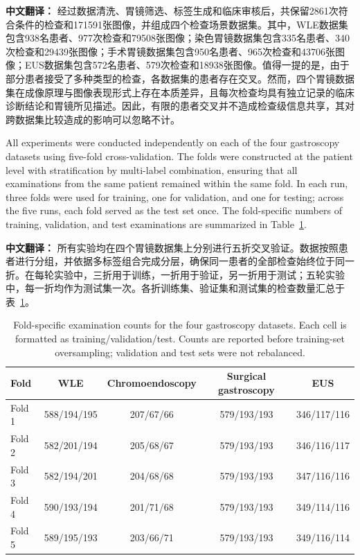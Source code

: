 \documentclass[Afour,sagev,times]{sagej}
\begin{document}
\textbf{中文翻译：} 经过数据清洗、胃镜筛选、标签生成和临床审核后，共保留2861次符合条件的检查和171591张图像，并组成四个检查场景数据集。其中，WLE数据集包含938名患者、977次检查和79508张图像；染色胃镜数据集包含335名患者、340次检查和29439张图像；手术胃镜数据集包含950名患者、965次检查和43706张图像；EUS数据集包含572名患者、579次检查和18938张图像。值得一提的是，由于部分患者接受了多种类型的检查，各数据集的患者存在交叉。然而，四个胃镜数据集在成像原理与图像表现形式上存在本质差异，且每次检查均具有独立记录的临床诊断结论和胃镜所见描述。因此，有限的患者交叉并不造成检查级信息共享，其对跨数据集比较造成的影响可以忽略不计。

All experiments were conducted independently on each of the four gastroscopy datasets using five-fold cross-validation. The folds were constructed at the patient level with stratification by multi-label combination, ensuring that all examinations from the same patient remained within the same fold. In each run, three folds were used for training, one for validation, and one for testing; across the five runs, each fold served as the test set once. The fold-specific numbers of training, validation, and test examinations are summarized in Table~\ref{T1}.

\textbf{中文翻译：} 所有实验均在四个胃镜数据集上分别进行五折交叉验证。数据按照患者进行分组，并依据多标签组合完成分层，确保同一患者的全部检查始终位于同一折。在每轮实验中，三折用于训练，一折用于验证，另一折用于测试；五轮实验中，每一折均作为测试集一次。各折训练集、验证集和测试集的检查数量汇总于表~\ref{T1}。

\begin{table}[h]
\small\sf\centering
\caption{Fold-specific examination counts for the four gastroscopy datasets. Each cell is formatted as training/validation/test. Counts are reported before training-set oversampling; validation and test sets were not rebalanced.\label{T1}}
\begin{tabular}{lcccc}
\toprule
Fold & WLE & Chromoendoscopy & Surgical gastroscopy & EUS \\
\midrule
Fold 1 & 588/194/195 & 207/67/66 & 579/193/193 & 346/117/116 \\
Fold 2 & 582/201/194 & 205/68/67 & 579/193/193 & 346/116/117 \\
Fold 3 & 582/194/201 & 204/68/68 & 579/193/193 & 347/116/116 \\
Fold 4 & 590/193/194 & 201/71/68 & 579/193/193 & 349/114/116 \\
Fold 5 & 589/195/193 & 203/66/71 & 579/193/193 & 349/116/114 \\
\bottomrule
\end{tabular}
\end{table}
\end{document}
